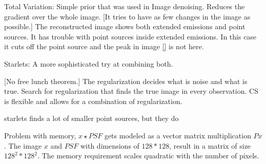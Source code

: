 Total Variation: Simple prior that was used in Image denoising. Reduces the gradient over the whole image. [It tries to have as few changes in the image as possible.] The reconstructed image shows both extended emissions and point sources. It has trouble with point sources inside extended emissions. In this case it cuts off the point source and the peak in image \ref{} is not here.

Starlets: A more sophisticated try at combining both. 





[No free lunch theorem.] The regularization decides what is noise and what is true. Search for regularization that finds the true image in every observation. CS is flexible and allows for a combination of regularization.

starlets finds a lot of smaller point sources, but they do

Problem with memory, $x \star PSF$ gets modeled as a vector matrix multiplication $Px$. The image $x$ and $PSF$ with dimensions of $128 * 128$, result in a matrix of size $128^2 * 128^2$. The memory requirement scales quadratic with the number of pixels. 

